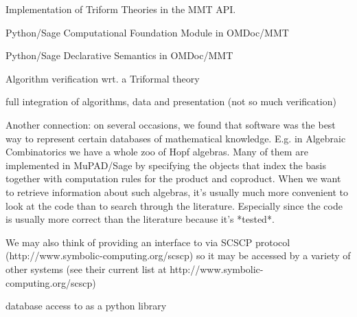 \begin{workpackage}[id=dksbases,wphases=1-48!.5,
  title=Data/Knowledge/Software-Bases,lead=JU,
  ZHRM=12,JURM=36,USHRM=12,UWRM=3,SARM=10]
\begin{wpdelivs}
\begin{wpdeliv}[due=24,id=dksimp,dissem=PU,nature=O,lead=JU]
        {Implementation of Triform Theories in the MMT API.}
  \end{wpdeliv}
  \begin{wpdeliv}[due=24,id=psfoundation,dissem=PU,nature=O,lead=JU]
        {Python/Sage Computational Foundation Module in OMDoc/MMT}
  \end{wpdeliv}
  \begin{wpdeliv}[due=36,id=pssem,dissem=PU,nature=O,lead=JU]
      {Python/Sage Declarative Semantics in OMDoc/MMT}
  \end{wpdeliv}
  \begin{wpdeliv}[due=36,id=lfmverif,dissem=PU,nature=O,lead=JU]
      {\LMFDB Algorithm verification wrt. a Triformal theory}
  \end{wpdeliv}
  \begin{wpdeliv}[due=46,id=lfmint,dissem=PU,nature=R,lead=JU]
      {\LMFDB full integration of algorithms, data and presentation (not so much verification)}
  \end{wpdeliv}
\end{wpdelivs}


Another connection: on several occasions, we found that software was the best way to
represent certain databases of mathematical knowledge. E.g. in Algebraic Combinatorics we
have a whole zoo of Hopf algebras. Many of them are implemented in MuPAD/Sage by
specifying the objects that index the basis together with computation rules for the
product and coproduct. When we want to retrieve information about such algebras, it's
usually much more convenient to look at the code than to search through the
literature. Especially since the code is usually more correct than the literature because
it's *tested*.


We may also think of providing an interface to \LMFDB via SCSCP
protocol (http://www.symbolic-computing.org/scscp) so it may
be accessed by a variety of other systems (see their current
list at http://www.symbolic-computing.org/scscp)


database access to \LMFDB as a python library
\end{workpackage}

